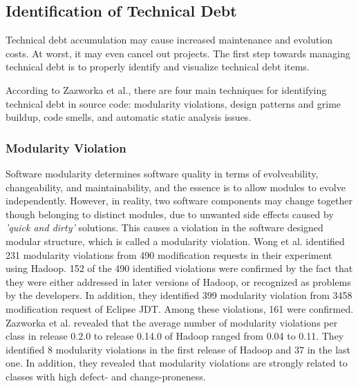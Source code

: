 \subsection{Identification of Technical Debt}
Technical debt accumulation may cause increased maintenance and evolution costs. At worst, it may even cancel out projects. The first step towards managing technical debt is to properly identify and visualize  technical debt items. 

According to Zazworka et al.\cite{zazworka2014comparing}, there are four main techniques for identifying technical debt in source code: modularity violations, design patterns and grime buildup, code smells, and automatic static analysis issues. 

\subsubsection{Modularity Violation}
Software modularity determines software quality in terms of evolveability, changeability, and maintainability\cite{huynh2007evolutionary}, and the essence is to allow modules to evolve independently. However, in reality, two software components may change together though belonging to distinct modules, due to unwanted side effects caused by \textit{'quick and dirty'} solutions\cite{wong2011detecting,zazworka2014comparing}. This causes a violation in the software designed modular structure, which is called a modularity violation. Wong et al.\cite{wong2011detecting} identified 231 modularity violations from 490 modification requests in their experiment using Hadoop. 152 of the 490 identified violations were confirmed by the fact that they were either addressed in later versions of Hadoop, or recognized as problems by the developers. In addition, they identified 399 modularity violation from 3458 modification request of Eclipse JDT\cite{wong2011detecting}. Among these violations, 161 were confirmed. Zazworka et al.\cite{zazworka2014comparing} revealed that the average number of modularity violations per class in release 0.2.0 to release 0.14.0 of Hadoop ranged from 0.04 to 0.11. They identified 8 modularity violations in the first release of Hadoop and 37 in the last one. In addition, they revealed that modularity violations are strongly related to classes with high defect- and change-proneness. 



